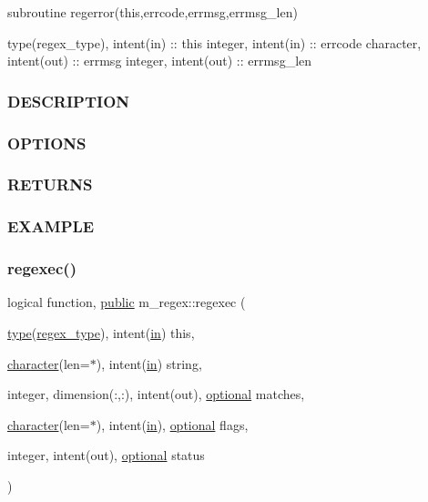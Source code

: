 subroutine regerror(this,errcode,errmsg,errmsg\+\_\+len)

type(regex\+\_\+type), intent(in) \+:\+: this integer, intent(in) \+:\+: errcode character, intent(out) \+:\+: errmsg integer, intent(out) \+:\+: errmsg\+\_\+len

\subsubsection*{D\+E\+S\+C\+R\+I\+P\+T\+I\+ON}

\subsubsection*{O\+P\+T\+I\+O\+NS}

\subsubsection*{R\+E\+T\+U\+R\+NS}

\subsubsection*{E\+X\+A\+M\+P\+LE}\mbox{\label{namespacem__regex_a44394d605b1a98fb246bc4622a08f878}} 
\subsubsection{\texorpdfstring{regexec()}{regexec()}}
{\footnotesize\ttfamily logical function, \hyperlink{M__stopwatch_83_8txt_a2f74811300c361e53b430611a7d1769f}{public} m\+\_\+regex\+::regexec (\begin{DoxyParamCaption}\item[{\hyperlink{stop__watch_83_8txt_a70f0ead91c32e25323c03265aa302c1c}{type}(\hyperlink{structm__regex_1_1regex__type}{regex\+\_\+type}), intent(\hyperlink{M__journal_83_8txt_afce72651d1eed785a2132bee863b2f38}{in})}]{this,  }\item[{\hyperlink{option__stopwatch_83_8txt_abd4b21fbbd175834027b5224bfe97e66}{character}(len=$\ast$), intent(\hyperlink{M__journal_83_8txt_afce72651d1eed785a2132bee863b2f38}{in})}]{string,  }\item[{integer, dimension(\+:,\+:), intent(out), \hyperlink{option__stopwatch_83_8txt_aa4ece75e7acf58a4843f70fe18c3ade5}{optional}}]{matches,  }\item[{\hyperlink{option__stopwatch_83_8txt_abd4b21fbbd175834027b5224bfe97e66}{character}(len=$\ast$), intent(\hyperlink{M__journal_83_8txt_afce72651d1eed785a2132bee863b2f38}{in}), \hyperlink{option__stopwatch_83_8txt_aa4ece75e7acf58a4843f70fe18c3ade5}{optional}}]{flags,  }\item[{integer, intent(out), \hyperlink{option__stopwatch_83_8txt_aa4ece75e7acf58a4843f70fe18c3ade5}{optional}}]{status }\end{DoxyParamCaption})}



